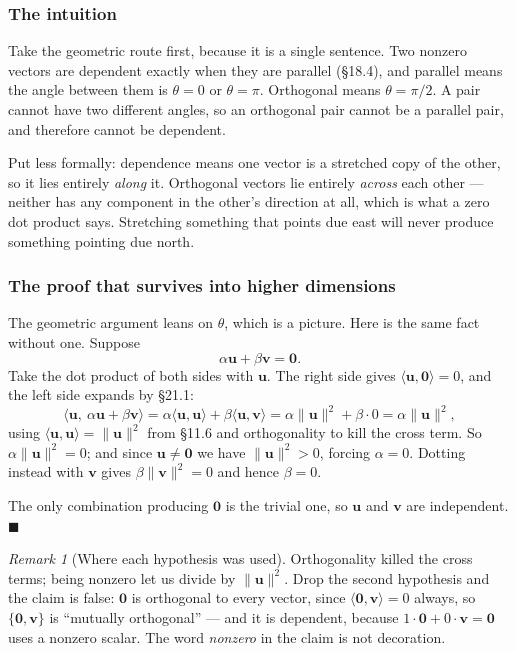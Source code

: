 \documentclass[11pt]{article}
\theoremstyle{definition}
\theoremstyle{remark}
\newtheorem*{rmk}{Remark}
\newcommand{\vc}[1]{\mathbf{#1}}
\newcommand{\norm}[1]{\lVert #1\rVert}
\begin{document}
\subsubsection*{The intuition}
Take the geometric route first, because it is a single sentence. Two nonzero
vectors are dependent exactly when they are parallel (\S18.4), and parallel
means the angle between them is $\theta=0$ or $\theta=\pi$. Orthogonal means
$\theta=\pi/2$. A pair cannot have two different angles, so an orthogonal pair
cannot be a parallel pair, and therefore cannot be dependent.

Put less formally: dependence means one vector is a stretched copy of the other,
so it lies entirely \emph{along} it. Orthogonal vectors lie entirely
\emph{across} each other --- neither has any component in the other's direction
at all, which is what a zero dot product says. Stretching something that points
due east will never produce something pointing due north.

\subsubsection*{The proof that survives into higher dimensions}
The geometric argument leans on $\theta$, which is a picture. Here is the same
fact without one. Suppose
\[
  \alpha\vc{u} + \beta\vc{v} = \vc{0} .
\]
Take the dot product of both sides with $\vc{u}$. The right side gives
$\langle\vc{u},\vc{0}\rangle=0$, and the left side expands by \S21.1:
\[
  \bigl\langle \vc{u},\ \alpha\vc{u}+\beta\vc{v}\bigr\rangle
  = \alpha\langle\vc{u},\vc{u}\rangle + \beta\langle\vc{u},\vc{v}\rangle
  = \alpha\norm{\vc{u}}^{2} + \beta\cdot 0
  = \alpha\norm{\vc{u}}^{2} ,
\]
using $\langle\vc{u},\vc{u}\rangle=\norm{\vc{u}}^{2}$ from \S11.6 and
orthogonality to kill the cross term. So $\alpha\norm{\vc{u}}^{2}=0$; and since
$\vc{u}\neq\vc{0}$ we have $\norm{\vc{u}}^{2}>0$, forcing $\alpha=0$. Dotting
instead with $\vc{v}$ gives $\beta\norm{\vc{v}}^{2}=0$ and hence $\beta=0$.

The only combination producing $\vc{0}$ is the trivial one, so $\vc{u}$ and
$\vc{v}$ are independent. \hfill$\blacksquare$

\begin{rmk}[Where each hypothesis was used]
Orthogonality killed the cross terms; being nonzero let us divide by
$\norm{\vc{u}}^{2}$. Drop the second hypothesis and the claim is false:
$\vc{0}$ is orthogonal to every vector, since
$\langle\vc{0},\vc{v}\rangle=0$ always, so $\{\vc{0},\vc{v}\}$ is
``mutually orthogonal'' --- and it is dependent, because
$1\cdot\vc{0}+0\cdot\vc{v}=\vc{0}$ uses a nonzero scalar. The word
\emph{nonzero} in the claim is not decoration.
\end{rmk}
\end{document}

